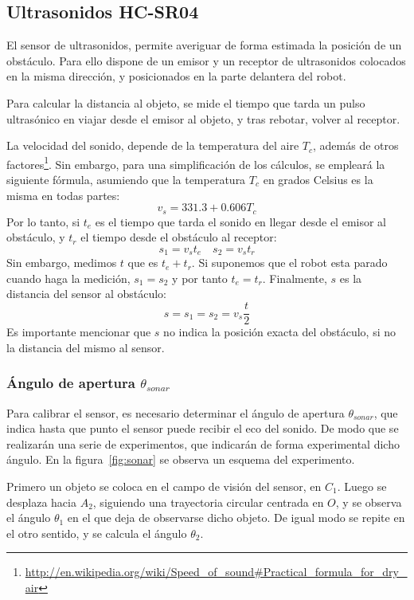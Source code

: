 \documentclass[10pt,a4paper,hidelinks]{article}
\begin{document}
\begin{multicols}{2}
\subsection{Ultrasonidos HC-SR04}

El sensor de ultrasonidos, permite averiguar de forma estimada la posición de un obstáculo. Para ello dispone de un emisor y un receptor de ultrasonidos colocados en la misma dirección, y posicionados en la parte delantera del robot.

Para calcular la distancia al objeto, se mide el tiempo que tarda un pulso
ultrasónico en viajar desde el emisor al objeto, y tras rebotar, volver al
receptor.

La velocidad del sonido, depende de la temperatura del aire $T_c$, además
de otros
factores\footnote{\url{http://en.wikipedia.org/wiki/Speed\_of\_sound\#Practical\_formula\_for\_dry\_air}}.
Sin embargo, para una simplificación de los cálculos, se empleará la siguiente
fórmula, asumiendo que la temperatura $T_c$ en grados Celsius es la misma en 
todas partes:
$$ v_{s} = 331.3 + 0.606T_c $$
Por lo tanto, si $t_e$ es el tiempo que tarda el sonido en llegar desde el 
emisor al obstáculo, y $t_r$ el tiempo desde el obstáculo al receptor:
$$ s_1 = v_{s} t_e \quad s_2 = v_{s} t_r $$
Sin embargo, medimos $t$ que es $t_e+t_r$. Si suponemos que el robot esta parado 
cuando haga la medición, $s_1 = s_2$ y por tanto $t_e = t_r$. Finalmente, $s$ es 
la distancia del sensor al obstáculo:
\begin{equation}
	s = s_1 = s_2 = v_{s}\frac{t}{2}\label{eq:velocidad-sonido}
\end{equation}
Es importante mencionar que $s$ no indica la posición exacta del obstáculo, si 
no la distancia del mismo al sensor.

\subsubsection{Ángulo de apertura $\theta_{sonar}$}
Para calibrar el sensor, es necesario determinar el ángulo de apertura 
$\theta_{sonar}$, que indica hasta que punto el sensor puede recibir el eco del 
sonido. De modo que se realizarán una serie de experimentos, que indicarán de 
forma experimental dicho ángulo. En la figura~\ref{fig:sonar} se observa un
esquema del experimento.

Primero un objeto se coloca en el campo de visión del sensor, en $C_1$. Luego se 
desplaza hacia $A_2$, siguiendo una trayectoria circular centrada en $O$, y se 
observa el ángulo $\theta_1$ en el que deja de observarse dicho objeto. De igual 
modo se repite en el otro sentido, y se calcula el ángulo $\theta_{2}$.


\end{multicols}
\end{document}
